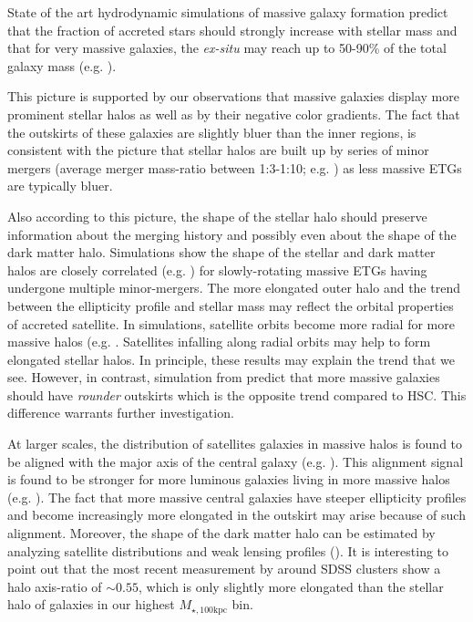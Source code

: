 \documentclass[a4paper,fleqn,usenatbib]{mnras}
\def\mtot{{$M_{\star,100\mathrm{kpc}}$}}
\begin{document}
    State of the art hydrodynamic simulations of massive galaxy formation predict 
    that the fraction of accreted stars should strongly increase with stellar 
    mass and that for very massive galaxies, the \textit{ex-situ} may reach up to 
    50-90\% of the total galaxy mass (e.g.
    \citealt{Oser2010, Cooper2013, Dubois2013, LeeYi2013, Hirschmann2015,
    RodriguezGomez2016}). 
    
    This picture is supported by our observations that massive galaxies display more 
    prominent stellar halos as well as by their  negative color gradients. 
    The fact that the outskirts of these galaxies are slightly bluer than the inner
    regions, is consistent with the picture that stellar halos are built up by 
    series of minor mergers (average merger mass-ratio between 1:3-1:10; e.g. 
    \citealt{Huang2016}) as less massive ETGs are typically bluer. 

    Also according to this picture, the shape of the stellar halo should preserve
    information about the merging history and possibly even about the shape of the 
    dark matter halo. 
    Simulations show the shape of the stellar and dark matter halos are closely 
    correlated (e.g. \citealt{Wu2014}) for slowly-rotating massive ETGs having 
    undergone multiple minor-mergers.
    The more elongated outer halo and the trend between the ellipticity profile and 
    stellar mass may reflect the orbital properties of accreted satellite. 
    In simulations, satellite orbits become more radial for more massive halos 
    (e.g. \citealt{Murante2007, Wetzel2011, Jiang2015}. 
    Satellites infalling along radial orbits may help to form elongated stellar 
    halos.
    In principle, these results may explain the trend that we see. 
    However, in contrast, simulation from \citet{Wu2014} predict that more massive 
    galaxies should have \emph{rounder} outskirts which is the opposite trend 
    compared to HSC. 
    This difference warrants further investigation.
    
    At larger scales, the distribution of satellites galaxies in massive halos is 
    found to be aligned with the major axis of the central galaxy 
    (e.g. \citealt{Brainerd2005, Yang2006b, NiedersteOstholt2010, 
    HuangMandelbaum2016}). 
    This alignment signal is found to be stronger for more luminous galaxies 
    living in more massive halos (e.g. \citealt{Hirata2007}).
    The fact that more massive central galaxies have steeper ellipticity profiles 
    and become increasingly more elongated in the outskirt may arise because of 
    such alignment. 
    Moreover, the shape of the dark matter halo can be estimated by analyzing 
    satellite distributions and weak lensing profiles (\citealt{ClampittJain2016}). 
    It is interesting to point out that the most recent measurement by 
    \citet{Shin2017} around SDSS clusters show a halo axis-ratio of ${\sim}0.55$, 
    which is only slightly more elongated than the stellar halo of galaxies in our 
    highest \mtot{} bin.
    
\end{document}
